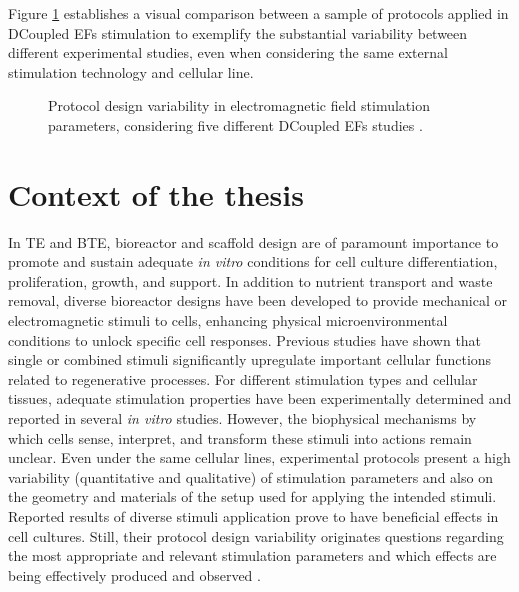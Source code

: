 Figure \ref{fig: F3} establishes a visual comparison between a sample of protocols applied in \ac{DCoupled} \acs{EFs} stimulation to exemplify the substantial variability between different experimental studies, even when considering the same external stimulation technology and cellular line.

\begin{figure}
\caption{Protocol design variability in electromagnetic field stimulation parameters, considering five different \ac{DCoupled} \acs{EFs} studies \cite{Srirussamee2021-cj, Hou2019-yd, Hronik-Tupaj2011-cx, Zhao2011-wy}.}
\label{fig: F3}
\end{figure} 


\section{Context of the thesis}

In TE and BTE, bioreactor and scaffold design are of paramount importance to promote and sustain adequate \textit{in vitro} conditions for cell culture differentiation, proliferation, growth, and support. In addition to nutrient transport and waste removal, diverse bioreactor designs have been developed to provide mechanical or electromagnetic stimuli to cells, enhancing physical microenvironmental conditions to unlock specific cell responses. Previous studies have shown that single or combined stimuli significantly upregulate important cellular functions related to regenerative processes. For different stimulation types and cellular tissues, adequate stimulation properties have been experimentally determined and reported in several \textit{in vitro} studies. However, the biophysical mechanisms by which cells sense, interpret, and transform these stimuli into actions remain unclear. Even under the same cellular lines, experimental protocols present a high variability (quantitative and qualitative) of stimulation parameters and also on the geometry and materials of the setup used for applying the intended stimuli. Reported results of diverse stimuli application prove to have beneficial effects in cell cultures. Still, their protocol design variability originates questions regarding the most appropriate and relevant stimulation parameters and which effects are being effectively produced and observed \cite{Thrivikraman2018-su}.

